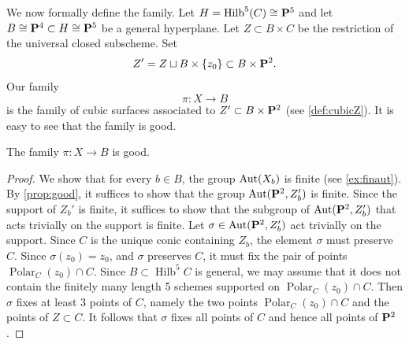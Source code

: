 \documentclass[12pt,reqno]{amsart}
\DeclareMathOperator{\Polar}{Polar}
\DeclareMathOperator{\Hilb}{Hilb}
\renewcommand{\to}{{\longrightarrow}}
\numberwithin{equation}{section}
\begin{document}
We now formally define the family.
Let $H = \Hilb^5(C) \cong \P^5$ and let $B \cong \P^4 \subset H \cong \P^5$ be a general hyperplane.
Let $Z \subset B \times C$ be the restriction of the universal closed subscheme.
Set 
\[Z' = Z \sqcup B \times \{z_0\} \subset B \times \P^2.\]
Our family
\[\pi \colon X \to B\]
is the family of cubic surfaces associated to $Z' \subset B \times \P^2$ (see \autoref{def:cubicZ}).
It is easy to see that the family is good.
\begin{proposition}\label{prop:goodnessB1}
  The family $\pi \colon X \to B$ is good.
\end{proposition}
\begin{proof}
  We show that for every $b \in B$, the group $\Aut(X_b)$ is finite (see \autoref{ex:finaut}).
  By \autoref{prop:good}, it suffices to show that the group $\Aut(\P^2, Z_b')$ is finite.
  Since the support of $Z_b'$ is finite, it suffices to show that the subgroup of $\Aut(\P^2, Z'_b)$ that acts trivially on the support is finite.
  Let $\sigma \in \Aut(\P^2, Z'_b)$ act trivially on the support.
  Since $C$ is the unique conic containing $Z_b$, the element $\sigma$ must preserve $C$.
  Since $\sigma(z_0) = z_0$, and $\sigma$ preserves $C$, it must fix the pair of points $\Polar_C(z_0) \cap C$.
  Since $B \subset \Hilb^5C$ is general, we may assume that it does not contain the finitely many length 5 schemes supported on $\Polar_C(z_0) \cap C$.
  Then $\sigma$ fixes at least 3 points of $C$, namely the two points $\Polar_C(z_0) \cap C$ and the points of $Z \subset C$.
  It follows that $\sigma$ fixes all points of $C$ and hence all points of $\P^2$.
\end{proof}
\end{document}
